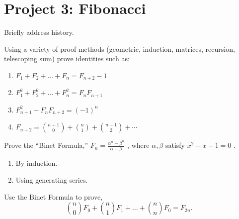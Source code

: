 \documentclass[10pt,]{book}
\theoremstyle{plain}
\theoremstyle{definition}
\theoremstyle{definition}
\theoremstyle{definition}
\theoremstyle{definition}
\numberwithin{equation}{chapter}
\begin{document}
\typeout{************************************************}
\typeout{************************************************}
\section[{Project 3: Fibonacci}]{Project 3: Fibonacci}\label{exercises-13}
\begin{divisionexercise}{1}\hypertarget{exercise-139}{}
\hypertarget{p-1185}{}%
Briefly address history.%
\end{divisionexercise}%
\begin{divisionexercise}{2}\hypertarget{exercise-140}{}
\hypertarget{p-1186}{}%
Using a variety of proof methods (geometric, induction, matrices, recursion, telescoping sum) prove identities such as: \leavevmode%
\begin{enumerate}[label=(\alph*)]
\item\hypertarget{li-251}{}\hypertarget{p-1187}{}%
\(F_{1} + F_{2} + \ldots + F_{n} = F_{n + 2} - 1\)%
\item\hypertarget{li-252}{}\hypertarget{p-1188}{}%
\(F_{1}^{2} + F_{2}^{2} + \ldots + F_{n}^{2} = F_{n}F_{n + 1}\)%
\item\hypertarget{li-253}{}\hypertarget{p-1189}{}%
\(F_{n + 1}^{2} - F_{n}F_{n + 2} = \left( - 1 \right)^{n}\)%
\item\hypertarget{li-254}{}\hypertarget{p-1190}{}%
\(F_{n + 2} = \binom{n + 1}{0} + \binom{n}{1} + \binom{n - 1}{2} + \cdots\)%
\end{enumerate}
%
\end{divisionexercise}%
\begin{divisionexercise}{3}\hypertarget{exercise-141}{}
\hypertarget{p-1191}{}%
Prove the ``Binet Formula,'' \(F_{n} = \frac{\alpha^{n} - \beta^{n}}{\alpha - \beta}\) , where \(\alpha,\beta\) satisfy \(x^{2} - x - 1 = 0\) . \leavevmode%
\begin{enumerate}[label=(\alph*)]
\item\hypertarget{li-255}{}\hypertarget{p-1192}{}%
By induction.%
\item\hypertarget{li-256}{}\hypertarget{p-1193}{}%
Using generating series.%
\end{enumerate}
%
\end{divisionexercise}%
\begin{divisionexercise}{4}\hypertarget{exercise-142}{}
\hypertarget{p-1194}{}%
Use the Binet Formula to prove,%
\begin{equation*}
\binom{n}{0}F_{0} + \binom{n}{1} F_{1} + \ldots + \binom{n}{n}F_{0} = F_{2n}.
\end{equation*}
%
\end{divisionexercise}%
\end{document}
